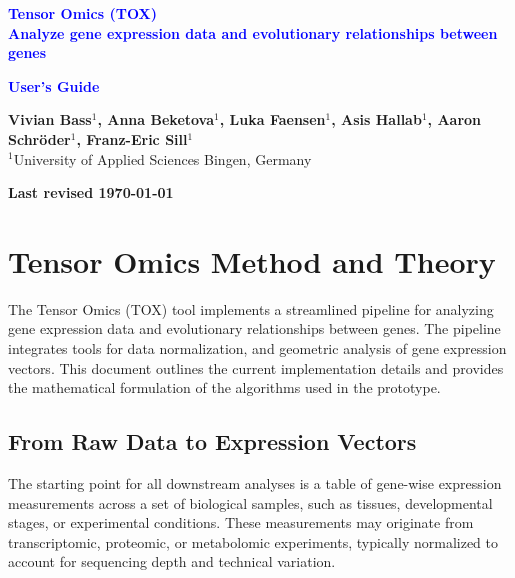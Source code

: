 \documentclass[11pt]{article}
\begin{document}
\vspace*{3cm}
\noindent
{\Huge \textcolor{blue}{\textbf{Tensor Omics (TOX)}}}\\[0.5cm]
\noindent
{\Huge \textcolor{blue}{\textbf{Analyze gene expression data and evolutionary relationships between genes}}}\\[0.5cm]
\vspace*{1cm}

\noindent
{\Huge \textcolor{blue}{\textbf{User’s Guide}}}

\vspace{2cm}

\noindent
\textbf{\large Vivian Bass$^{1}$, Anna Beketova$^{1}$, Luka Faensen$^{1}$,
	Asis Hallab$^{1}$, Aaron Schröder$^{1}$, Franz-Eric Sill$^{1}$}\\[0.2cm]
{\small $^{1}$University of Applied Sciences Bingen, Germany }

\vspace{2cm}

\noindent
\textbf{Last revised \today}

\newpage

\tableofcontents
\newpage
\section{Tensor Omics Method and Theory}

The Tensor Omics (TOX) tool implements a streamlined pipeline for analyzing
gene expression data and evolutionary relationships between genes. The pipeline
integrates tools for data normalization, and geometric analysis of gene
expression vectors. This document outlines the current implementation details and
provides the mathematical formulation of the algorithms used in the prototype.

\subsection{From Raw Data to Expression Vectors}

The starting point for all downstream analyses is a table of gene-wise
expression measurements across a set of biological samples, such as tissues,
developmental stages, or experimental conditions. These measurements may
originate from transcriptomic, proteomic, or metabolomic experiments, typically
normalized to account for sequencing depth and technical variation.
\end{document}
